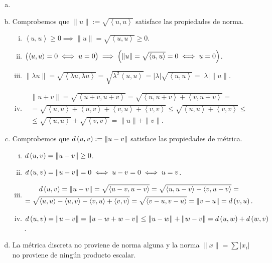 \begin{eje}
    \begin{enumerate}[(a)]
        \item[]
        \item Comprobemos que $\| u \| := \sqrt{\left< u, u \right>}$ satisface las propiedades de norma.
            \begin{enumerate}[i)]
                \item $\left< u, u \right> \geq 0 \implies \| u \| =  \sqrt{\left< u, u \right> } \geq 0$.
                \item $\left( \left< u, u \right> = 0 \iff u=0 \right) \implies \left( \| u \| = \sqrt{\left< u, u \right> } = 0 \iff u=0 \right)$.
                \item $\| \lambda u \| = \sqrt { \left< \lambda u, \lambda u \right> } = \sqrt {\lambda^2 \left< u, u \right> } = | \lambda | \sqrt { \left<  u,  u \right> } = | \lambda | \| u \|$.
                \item
                \begin{gather*}
                    \| u+v \| =\sqrt { \left< u + v , u+v \right>}=\sqrt { \left< u , u+v \right> + \left< v , u+v \right>}= \\
                    = \sqrt { \left< u , u\right> +\left< u , v \right> + \left< v , u \right> + \left< v , v \right>} \leq \sqrt { \left< u , u\right> + \left< v , v \right>} \leq \\
                    \leq \sqrt { \left< u , u\right>} + \sqrt{ \left< v , v \right>}= \| u \| + \| v \|.
                \end{gather*}
            \end{enumerate}
        \item Comprobemos que $d \left( u, v \right) := \| u - v \|$ satisface las propiedades de métrica.
            \begin{enumerate}[i)]
                \item $d \left( u, v \right) = \|u-v \| \geq 0$.
                \item $d\left( u, v \right) = \| u-v \| = 0 \iff u - v = 0 \iff u = v$.
                \item
                \begin{gather*}
                    d\left( u, v \right) = \| u-v \| = \sqrt { \left< u - v , u-v \right>} = \sqrt { \left< u , u-v \right> - \left< v , u-v \right>} = \\
                    = \sqrt { \left< u , u \right> - \left< u , v \right> - \left< v , u \right> + \left< v , v \right>}  = \sqrt { \left< v - u , v-u \right>} = \| v-u \| = d \left( v, u \right).
                \end{gather*}
                \item $d\left( u, v \right) = \| u -v \| = \| u -w +w -v \| \leq \|u-w \| + \| w-v \|= d \left( u, w \right) + d \left( w, v \right)$.
            \end{enumerate}
        \item La métrica discreta no proviene de norma alguna y la norma $\| x \| = \sum | x_i |$ no proviene de ningún producto escalar.
    \end{enumerate}
\end{eje}

